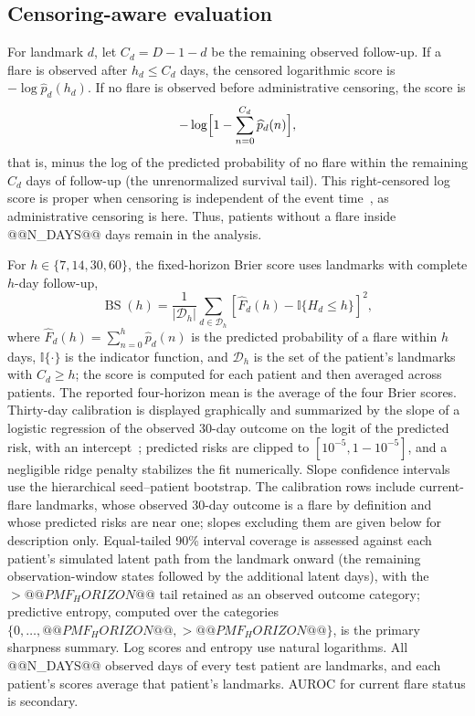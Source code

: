 \documentclass{ieeeaccess}
\begin{document}
\subsection{Censoring-aware evaluation}\label{sec:censoring}
For landmark $d$, let $C_d=D-1-d$ be the remaining observed follow-up. If a flare is observed after $h_d\le C_d$ days, the censored logarithmic score is $-\log\widehat p_d(h_d)$. If no flare is observed before administrative censoring, the score is
\begin{equation}
-\log\Bigl[1-\sum_{n=0}^{C_d}\widehat p_d(n)\Bigr],
\end{equation}
that is, minus the log of the predicted probability of no flare within the remaining $C_d$ days of follow-up (the unrenormalized survival tail). This right-censored log score is proper when censoring is independent of the event time~\cite{rindt2022}, as administrative censoring is here. Thus, patients without a flare inside @@N_DAYS@@ days remain in the analysis.

For $h\in\{7,14,30,60\}$, the fixed-horizon Brier score uses landmarks with complete $h$-day follow-up,
\begin{equation}
\operatorname{BS}(h)=\frac1{|\mathcal D_h|}\sum_{d\in\mathcal D_h}
\left[\widehat F_d(h)-\mathbb I\{H_d\le h\}\right]^2,
\end{equation}
where $\widehat F_d(h)=\sum_{n=0}^{h}\widehat p_d(n)$ is the predicted probability of a flare within $h$ days, $\mathbb I\{\cdot\}$ is the indicator function, and $\mathcal D_h$ is the set of the patient's landmarks with $C_d\ge h$; the score is computed for each patient and then averaged across patients. The reported four-horizon mean is the average of the four Brier scores. Thirty-day calibration is displayed graphically and summarized by the slope of a logistic regression of the observed 30-day outcome on the logit of the predicted risk, with an intercept~\cite{cox1958}; predicted risks are clipped to $[10^{-5},1-10^{-5}]$, and a negligible ridge penalty stabilizes the fit numerically. Slope confidence intervals use the hierarchical seed--patient bootstrap. The calibration rows include current-flare landmarks, whose observed 30-day outcome is a flare by definition and whose predicted risks are near one; slopes excluding them are given below for description only. Equal-tailed 90\% interval coverage is assessed against each patient's simulated latent path from the landmark onward (the remaining observation-window states followed by the additional latent days), with the ${>}@@PMF_HORIZON@@$ tail retained as an observed outcome category; predictive entropy, computed over the categories $\{0,\ldots,@@PMF_HORIZON@@,{>}@@PMF_HORIZON@@\}$, is the primary sharpness summary. Log scores and entropy use natural logarithms. All @@N_DAYS@@ observed days of every test patient are landmarks, and each patient's scores average that patient's landmarks. AUROC for current flare status is secondary.
\end{document}
